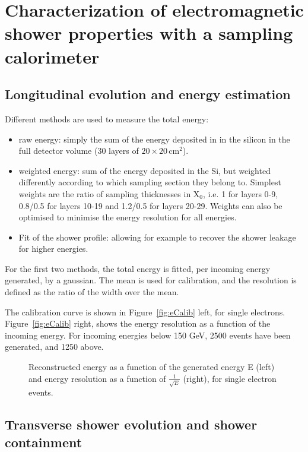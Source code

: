 %
%
%
\clearpage
\section{Characterization of electromagnetic shower properties with
a sampling calorimeter}
\label{sec:emshowerproperties}


\subsection{Longitudinal evolution and energy estimation}
\label{subsec:longevol}


Different methods are used to measure the total energy:
\begin{itemize}
\item raw energy: simply the sum of the energy deposited in  in
  the silicon in the full detector volume (30 layers of $20 \times
  20$\,cm$^2$).
\item weighted energy: sum of the energy deposited in the Si, but
  weighted differently according to which sampling section they belong
  to. Simplest weights are the ratio of sampling thicknesses in X$_0$,
  i.e. 1 for layers 0-9, 0.8/0.5 for layers 10-19 and 1.2/0.5 for
  layers 20-29. Weights can also be optimised to minimise the energy
  resolution for all energies.
\item Fit of the shower profile: allowing for example to recover the
  shower leakage for higher energies.
\end{itemize}

For the first two methods, the total energy is fitted, per incoming
energy generated, by a gaussian. The mean is used for calibration, and
the resolution is defined as the ratio of the width over the mean.

The calibration curve is shown in Figure~\ref{fig:eCalib} left, for
single electrons. Figure~\ref{fig:eCalib} right, shows the energy
resolution as a function of the incoming energy. For incoming energies
below 150 GeV, 2500 events have been generated, and 1250 above.

\begin{figure}[h!]
  \begin{center}
    \caption{Reconstructed energy as a function of the generated
      energy E (left) and energy resolution as a function of
      $\frac{1}{\sqrt{E}}$ (right), for single electron events.}
    \label{fig:g4vis}
  \end{center}
\end{figure}


\subsection{Transverse shower evolution and shower containment}
\label{subsec:transvevol}


